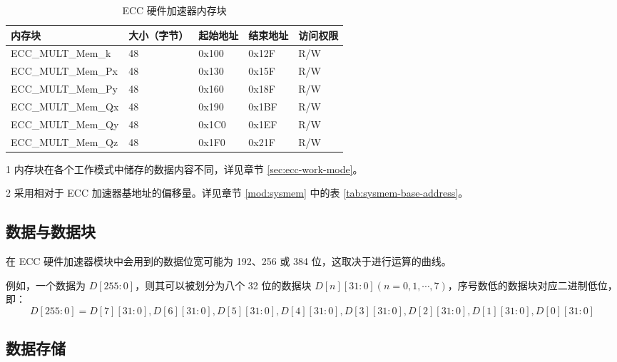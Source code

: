 \documentclass[main\_\_CN.tex]{subfiles}
\begin{document}
\begin{table}[H]
    \centering
    \caption{ECC 硬件加速器内存块} \label{tab:ecc-memory}
    \begin{threeparttable}
    \begin{tabular}{ | l | l | l | l | l |}
    \hline
        \rowcolor{lightgray}
        \textbf{内存块}\tnote{1} & \textbf{大小（字节）}  &  \textbf{起始地址}\tnote{2} &  \textbf{结束地址} \tnote{2} & \textbf{访问权限}   \\ \hline
        ECC\_MULT\_Mem\_k    & 48  & 0x100 & 0x12F & R/W \\ \hline
        ECC\_MULT\_Mem\_Px   & 48  & 0x130 & 0x15F & R/W \\ \hline
        ECC\_MULT\_Mem\_Py   & 48  & 0x160 & 0x18F & R/W \\ \hline
        ECC\_MULT\_Mem\_Qx   & 48  & 0x190 & 0x1BF & R/W \\ \hline
        ECC\_MULT\_Mem\_Qy   & 48  & 0x1C0 & 0x1EF & R/W \\ \hline
        ECC\_MULT\_Mem\_Qz   & 48  & 0x1F0 & 0x21F & R/W \\ \hline
    \end{tabular}
    \begin{tablenotes}
        \item[1] 内存块在各个工作模式中储存的数据内容不同，详见章节 \ref{sec:ecc-work-mode}。
        \item[2] 采用相对于 ECC 加速器基地址的偏移量。详见章节 \ref{mod:sysmem} \textit{} 中的表 \ref{tab:sysmem-base-address}。
    \end{tablenotes}
    \end{threeparttable}
\end{table}

\subsection{数据与数据块}

在 ECC 硬件加速器模块中会用到的数据位宽可能为 192、256 或 384 位，这取决于进行运算的曲线。

例如，一个数据为 $D[255:0]$，则其可以被划分为八个 32 位的数据块 $D[n][31:0](n=0,1,\cdots,7)$，序号数低的数据块对应二进制低位，即：
\[
D[255:0] = {D[7][31:0],D[6][31:0],D[5][31:0],
D[4][31:0],D[3][31:0],D[2][31:0],D[1][31:0],D[0][31:0]}
\]

\subsection{数据存储}
\end{document}
